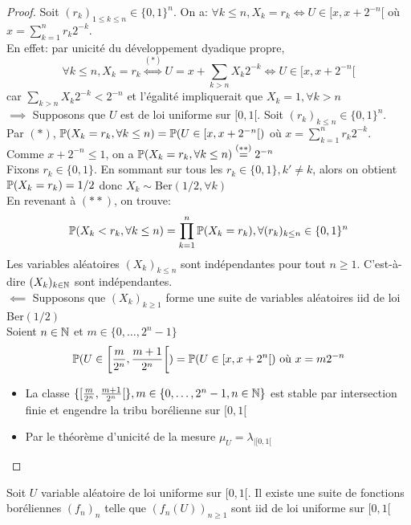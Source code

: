 \documentclass[]{report}
\begin{document}
    \begin{proof}
        Soit $(r_k)_{1\le k\le n}\in \{0,1\}^n$. On a: $\forall k\le n, X_k=r_k\iff U\in [x,x+2^{-n}[$ où $x=\sum_{k=1}^{n}r_k 2^{-k}$.\\
        En effet: par unicité du développement dyadique propre,
        \[\forall k\le n, X_k=r_k\overset{(*)}{\iff} U=x+\sum_{k>n} X_k 2^{-k}\iff U\in [x,x+2^{-n}[\]
        car $\sum_{k>n}X_k 2^{-k}<2^{-n}$ et l'égalité impliquerait que  $X_k=1,\forall k>n$\\
        $\implies$ Supposons que $U$ est de loi uniforme sur $[0,1[$. Soit $(r_k)_{k\le n}\in \{0,1\}^n$.\\
        Par $(*)$, $\mathbb{P}(X_k=r_k,\forall k\le n)=\mathbb{P}(U\in [x,x+2^{-n}[)$ où $x=\sum_{k=1}^{n}r_k2^{-k}$. Comme $x+2^{-n}\le 1$, on a $\mathbb{P}(X_k=r_k,\forall k\le n)\overset{(**)}{=}2^{-n}$\\
        Fixons $r_k\in \{0,1\}$. En sommant sur tous les $r_k\in\{0,1\},k'\neq k$, alors on obtient $\mathbb{P}(X_k=r_k)=1/2$ donc $X_k\sim \text{Ber}(1/2,\forall k)$\\
        En revenant à $(**)$, on trouve:
        \[\mathbb{P}(X_k<r_k,\forall k\le n)=\prod_{k=1}^{n}\mathbb{P}(X_k=r_k),\forall (r_k)_{k\le n}\in \{0,1\}^n\]
        Les variables aléatoires $(X_k)_{k\le n}$ sont indépendantes pour tout $n\ge 1$. C'est-à-dire $(X_k)_{k\in \mathbb{N}}$ sont indépendantes.\\
        $\impliedby$ Supposons que $(X_k)_{k\ge 1}$ forme une suite de variables aléatoires iid de loi Ber$(1/2)$\\
        Soient $n\in \mathbb{N}$ et $m\in \{0,\ldots,2^n-1\}$
        \[\mathbb{P}(U\in\left[\frac{m}{2^n},\frac{m+1}{2^n}\right[)=\mathbb{P}(U\in [x,x+2^n[)\text{ où $x=m2^{-n}$}\]
        \begin{itemize}
            \item La classe $\{[\frac{m}{2^n},\frac{m+1}{2^n}[\},m\in\{0,\ldots,2^{n}-1,n\in\mathbb{N}\}$ est stable par intersection finie et engendre la tribu borélienne sur $[0,1[$
            \item Par le théorème d'unicité de la mesure $\mu_U=\lambda_{|[0,1[}$
        \end{itemize}
    \end{proof}

    \begin{lm}{}{}
        Soit $U$ variable aléatoire de loi uniforme sur $[0,1[$. Il existe une suite de fonctions boréliennes $(f_n)_n$ telle que $(f_n(U))_{n\ge 1}$ sont iid de loi uniforme sur $[0,1[$
    \end{lm}
\end{document}
